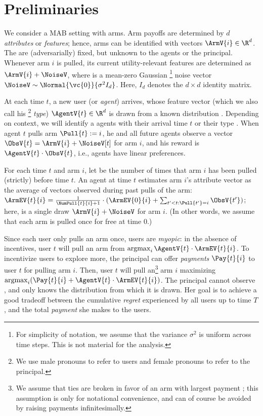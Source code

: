 \section{Preliminaries}
\label{sec:prob}

We consider a MAB setting with \ARMNUM arms.
Arm payoffs are determined by $d$ \emph{attributes} or \emph{features};
hence, arms can be identified with vectors $\ArmV{i} \in \R^d$.
The  are (adversarially) fixed, but unknown to the agents
or the principal.
Whenever arm $i$ is pulled, its current utility-relevant features are
determined as $\ArmV{i} + \NoiseV$, where \NoiseV is a mean-zero
Gaussian%
\footnote{For simplicity of notation, we assume that the variance
  $\sigma^2$ is uniform across time steps. This is not material for
  the analysis.}
noise vector $\NoiseV \sim \Normal{\vc{0}}{\sigma^2 I_{d}}$.
Here, $I_d$ denotes the $d \times d$ identity matrix.

At each time $t$, a new user (or \emph{agent}) arrives,
whose feature vector (which we also call his%
\footnote{We use male pronouns to refer to users and female pronouns
  to refer to the principal. 
  }
\emph{type}) $\AgentV{t} \in \R^d$ is drawn from a known distribution
\AgentDist.
Depending on context, we will identify a agents with their arrival time
$t$ or their type .
When agent $t$ pulls arm $\Pull{t} := i$,
he and all future agents observe a vector
$\ObsV{t} = \ArmV{i} + \NoiseV[t]$ for arm $i$,
and his reward is $\AgentV{t} \cdot \ObsV{t}$,
i.e., agents have linear preferences.

For each time $t$ and arm $i$, let  be the number of
times that arm $i$ has been pulled (strictly) before time $t$.
An agent at time $t$ estimates arm $i$'s attribute vector as the
average of vectors observed during past pulls of the arm:
$\ArmEV{t}{i} = \frac{1}{\NumPull{t}{i}+1} \cdot
(\ArmEV{0}{i} + \sum_{t'<t: \Pull{t'} = i} \ObsV{t'})$;
here,  is a single draw $\ArmV{i} + \NoiseV$ for arm $i$.
(In other words, we assume that each arm is pulled once for free at time 0.)

Since each user only pulls an arm once, users are \emph{myopic}:
in the absence of incentives, user $t$ will pull an arm from
$\argmax_i \AgentV{t} \cdot \ArmEV{t}{i}$.
To incentivize users to explore more, the principal can offer
\emph{payments} $\Pay{t}{i}$ to user $t$ for pulling arm $i$.
Then, user $t$ will pull an\footnote{We assume that ties are broken in
  favor of an arm with largest payment ; this assumption is
  only for notational convenience, and can of course be avoided by
  raising payments infinitesimally.} arm $i$ maximizing
$\argmax_i (\Pay{t}{i} + \AgentV{t} \cdot \ArmEV{t}{i})$.
The principal cannot observe ,
and only knows the distribution \AgentDist from which it is drawn.
Her goal is to achieve a good tradeoff between the cumulative
\emph{regret} experienced by all users up to time $T$,
and the total \emph{payment} she makes to the users.

